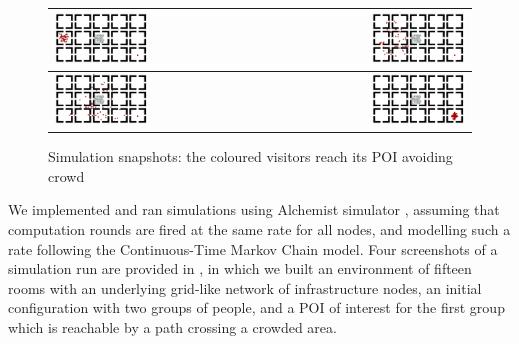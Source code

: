 \documentclass[12pt,a4paper,twoside,openright]{book}
\begin{document}
\begin{figure}[t]
\centering
\begin{tabular}{| l | r |}
\hline
\includegraphics[width=0.47\textwidth]{img/coordination-shot/1.png} &
\includegraphics[width=0.47\textwidth]{img/coordination-shot/2.png} \\
\hline
\includegraphics[width=0.47\textwidth]{img/coordination-shot/3.png} &
\includegraphics[width=0.47\textwidth]{img/coordination-shot/4.png} \\
\hline
\end{tabular}
\caption[Simulation of crowd sensitive gradient in $\sigma{}\tau{}$-Linda]{Simulation snapshots: the coloured visitors reach its POI avoiding crowd}
\label{img:linda-simulations}\vspace{-10pt}
\end{figure}
We implemented and ran simulations using Alchemist simulator \cite{mass2011}, assuming that computation rounds are fired at the same rate for all nodes, and modelling such a rate following the Continuous-Time Markov Chain model.
%
Four screenshots of a simulation run are provided in , in which we built an environment of fifteen rooms with an underlying grid-like network of infrastructure nodes, an initial configuration with two groups of people, and a POI of interest for the first group which is reachable by a path crossing a crowded area. 
\end{document}
